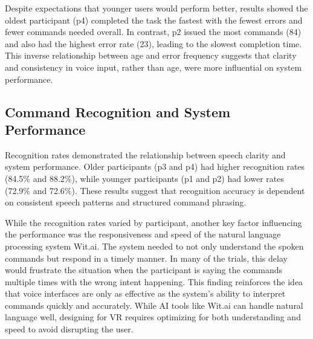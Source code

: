 \documentclass[manuscript, screen, review]{acmart}
\begin{document}
Despite expectations that younger users would perform better, results showed the oldest participant (p4) completed the task the fastest with the fewest errors and fewer commands needed overall. In contrast, p2 issued the most commands (84) and also had the highest error rate (23), leading to the slowest completion time. This inverse relationship between age and error frequency suggests that clarity and consistency in voice input, rather than age, were more influential on system performance. 
\subsection{Command Recognition and System Performance}
Recognition rates demonstrated the relationship between speech clarity and system performance. Older participants (p3 and p4) had higher recognition rates (84.5\% and 88.2\%), while younger participants (p1 and p2) had lower rates (72.9\% and 72.6\%). These results suggest that recognition accuracy is dependent on consistent speech patterns and structured command phrasing.

While the recognition rates varied by participant, another key factor influencing the performance was the responsiveness and speed of the natural language processing system Wit.ai. The system needed to not only understand the spoken commands but respond in a timely manner. In many of the trials, this delay would frustrate the situation when the participant is saying the commands multiple times with the wrong intent happening. This finding reinforces the idea that voice interfaces are only as effective as the system's ability to interpret commands quickly and accurately. While AI tools like Wit.ai can handle natural language well, designing for VR requires optimizing for both understanding and speed to avoid disrupting the user.
\end{document}
